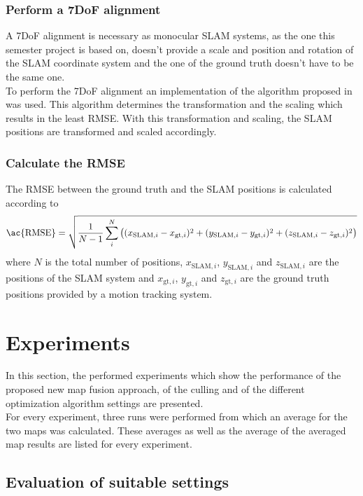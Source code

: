 \subsubsection{Perform a 7DoF alignment}
A 7DoF alignment is necessary as monocular \ac{SLAM} systems, as the one this semester project is based on, doesn't provide a scale and position and rotation of the \ac{SLAM} coordinate system and the one of the ground truth doesn't have to be the same one.\\

To perform the 7DoF alignment an implementation of the algorithm proposed in \cite{Umeyama1991} was used. This algorithm determines the transformation and the scaling which results in the least \ac{RMSE}. With this transformation and scaling, the \ac{SLAM} positions are transformed and scaled accordingly.

\subsubsection{Calculate the \acf{RMSE}}
The \acf{RMSE} between the ground truth and the \ac{SLAM} positions is calculated according to
\begin{equation}
  \text{\ac{RMSE}} = \sqrt{\frac{1}{N - 1} \sum_i^N \big( (x_{\text{SLAM},i} - x_{\text{gt},i})^2 + (y_{\text{SLAM},i} - y_{\text{gt},i})^2 + (z_{\text{SLAM},i} - z_{\text{gt},i})^2\big)}
\end{equation}
where $N$ is the total number of positions, $x_{\text{SLAM},i}$, $y_{\text{SLAM},i}$ and $z_{\text{SLAM},i}$ are the positions of the \ac{SLAM} system and $x_{\text{gt},i}$, $y_{\text{gt},i}$ and $z_{\text{gt},i}$ are the ground truth positions provided by a motion tracking system.

\section{Experiments}
\label{sec:experiments}

In this section, the performed experiments which show the performance of the proposed new map fusion approach, of the culling and of the different optimization algorithm settings are presented.\\

For every experiment, three runs were performed from which an average for the two maps was calculated. These averages as well as the average of the averaged map results are listed for every experiment.

\subsection{Evaluation of suitable settings}
\label{subsec:suitable_settings}

